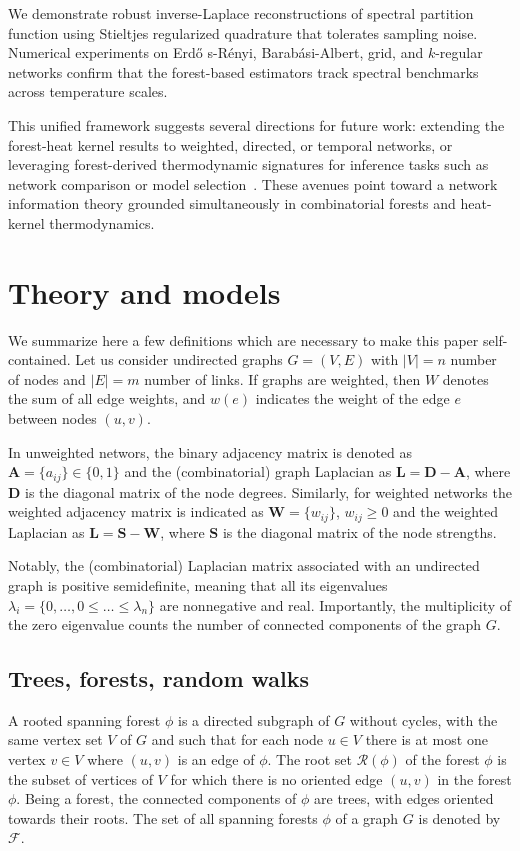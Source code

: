 \documentclass[10pt,aps,pre,twocolumn,nofootinbib,superscriptaddress,longbibliography]{revtex4-2}
\newcommand{\bA}{\mathbf{A}}
\newcommand{\bS}{\mathbf{S}}
\newcommand{\bD}{\mathbf{D}}
\newcommand{\bL}{\mathbf{L}}
\newcommand{\bW}{\mathbf{W}}
\begin{document}
We demonstrate robust inverse-Laplace reconstructions of spectral partition function using Stieltjes regularized quadrature that tolerates sampling noise.
Numerical experiments on Erd\H{o} s-Rényi, Barabási-Albert, grid, and $k$-regular networks confirm that the forest-based estimators track spectral benchmarks across temperature scales.

This unified framework suggests several directions for future work: extending the forest-heat kernel results to weighted, directed, or temporal networks, or leveraging forest-derived thermodynamic signatures for inference tasks such as network comparison or model selection~\cite{dedomenico2016b}.
These avenues point toward a network information theory grounded simultaneously in combinatorial forests and heat-kernel thermodynamics.

\section{Theory and models}
We summarize here a few definitions which are necessary to make this paper self-contained.
Let us consider undirected graphs $G=(V,E)$ with $|V|=n$ number of nodes and $|E|=m$ number of links. If graphs are weighted, then $W$ denotes the sum of all edge weights, and $w(e)$ indicates the weight of the edge $e$ between nodes $(u,v)$.

In unweighted networs, the binary adjacency matrix is denoted as $\bA=\{a_{ij}\} \in \{0,1\}$ and the (combinatorial) graph Laplacian as $\bL = \bD - \bA$, where $\bD$ is the diagonal matrix of the node degrees.
Similarly, for weighted networks the weighted adjacency matrix is indicated as $\bW = \{ w_{ij} \}$, $w_{ij}\geq 0$ and the weighted Laplacian as $\bL = \bS - \bW$, where $\bS$ is the diagonal matrix of the node strengths.

Notably, the (combinatorial) Laplacian matrix associated with an undirected graph is positive semidefinite, meaning that all its eigenvalues $\lambda_i = \{0,\ldots, 0 \leq \ldots \leq \lambda_n\}$ are nonnegative and real.
Importantly, the multiplicity of the zero eigenvalue counts the number of connected components of the graph $G$.

\subsection{Trees, forests, random walks}
A rooted spanning forest $\phi$ is a directed subgraph of $G$ without cycles, with the same vertex set $V$ of $G$ and such that for each node $u \in V$ there is at most one vertex $v \in V$ where $(u,v)$ is an edge of $\phi$.
The root set $\mathcal{R}(\phi)$ of the forest $\phi$ is the subset of vertices of $V$ for which there is no oriented edge $(u,v)$ in the forest $\phi$.
Being a forest, the connected components of $\phi$ are trees, with edges oriented towards their roots.
The set of all spanning forests $\phi$ of a graph $G$ is denoted by $\mathcal{F}$.
\end{document}
